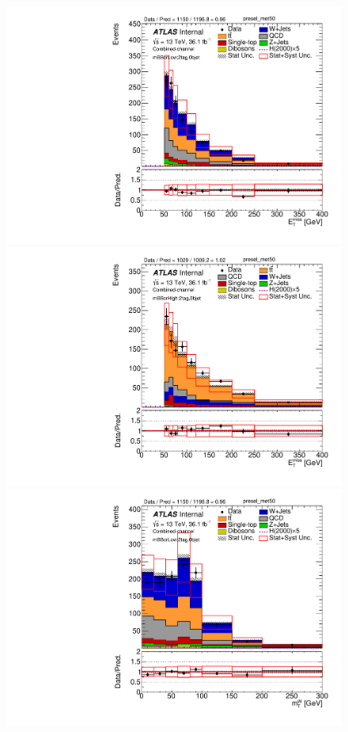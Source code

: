\begin{figure}[!h]
\begin{center}
\includegraphics[scale=0.33]{./figures/boosted/PlotByMbbRegions/DataMC_2tag_0bjet_mbbcrLow_lepton_presel_met50_MET}                                                                                 
\includegraphics[scale=0.33]{./figures/boosted/PlotByMbbRegions/DataMC_2tag_0bjet_mbbcrHigh_lepton_presel_met50_MET}                                                                                
\includegraphics[scale=0.33]{./figures/boosted/PlotByMbbRegions/DataMC_2tag_0bjet_mbbcrLow_lepton_presel_met50_WlepMtATLAS}                                                                         

\end{center}
\end{figure}
